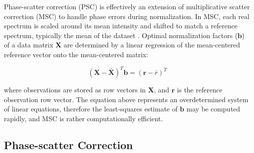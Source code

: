 \begin{doublespace}
Phase-scatter correction (PSC) is effectively an extension of multiplicative
scatter correction (MSC) to handle phase errors during normalization. In MSC,
each real spectrum is scaled around its mean intensity and shifted to match a
reference spectrum, typically the mean of the dataset \cite{fearn:cils2009}.
Optimal normalization factors ($\mathbf{b}$) of a data matrix $\mathbf{X}$ are
determined by a linear regression of the mean-centered reference vector onto
the mean-centered matrix:

\begin{equation}
(\mathbf{X} - \bar{\mathbf{X}})^T \mathbf{b} = (\mathbf{r} - \bar{r})^T
\end{equation}

where observations are stored as row vectors in $\mathbf{X}$, and $\mathbf{r}$
is the reference observation row vector. The equation above represents an
overdetermined system of linear equations, therefore the least-squares estimate
of $\mathbf{b}$ may be computed rapidly, and MSC is rather computationally
efficient.
\end{doublespace}

\subsection{Phase-scatter Correction}

